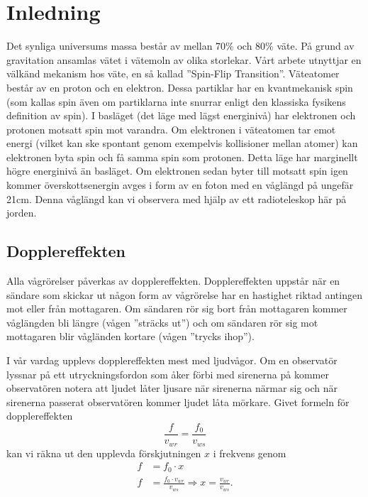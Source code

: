 \chapter{Inledning}

Det synliga universums massa består av mellan 70\% och 80\% väte. På grund av gravitation ansamlas vätet i vätemoln av olika storlekar. Vårt arbete utnyttjar en välkänd mekanism hos väte, en så kallad ''Spin-Flip Transition''\autocite{swin.edu:spin-flip}. Väteatomer består av en proton och en elektron. Dessa partiklar har en kvantmekanisk spin (som kallas spin även om partiklarna inte snurrar enligt den klassiska fysikens definition av spin). I basläget (det läge med lägst energinivå) har elektronen och protonen motsatt spin mot varandra. Om elektronen i väteatomen tar emot energi (vilket kan ske spontant genom exempelvis kollisioner mellan atomer) kan elektronen byta spin och få samma spin som protonen. Detta läge har marginellt högre energinivå än basläget. Om elektronen sedan byter till motsatt spin igen kommer överskottsenergin avges i form av en foton med en våglängd på ungefär 21cm. Denna våglängd kan vi observera med hjälp av ett radioteleskop här på jorden.

\section{Dopplereffekten}
Alla vågrörelser påverkas av dopplereffekten\autocite{nasa:doppler}. Dopplereffekten uppstår när en sändare som skickar ut någon form av vågrörelse har en hastighet riktad antingen mot eller från mottagaren. Om sändaren rör sig bort från mottagaren kommer våglängden bli längre (vågen ''sträcks ut'') och om sändaren rör sig mot mottagaren blir vågländen kortare (vågen ''trycks ihop''). 

I vår vardag upplevs dopplereffekten mest med ljudvågor. Om en observatör lyssnar på ett utryckningsfordon som åker förbi med sirenerna på kommer observatören notera att ljudet låter ljusare när sirenerna närmar sig och när sirenerna passerat observatören kommer ljudet låta mörkare. Givet formeln för dopplereffekten \autocite{wikipedia:doppler} 
\begin{equation*}
    \frac{f}{v_{wr}} = \frac{f_0}{v_{ws}}
\end{equation*}
kan vi räkna ut den upplevda  förskjutningen $x$ i frekvens genom 
\begin{align*}
    f &= f_0 \cdot x \\
    f &= \frac{f_0 \cdot v_{wr}}{v_{ws}} \Rightarrow x = \frac{v_{wr}}{v_{ws}}.
\end{align*}

